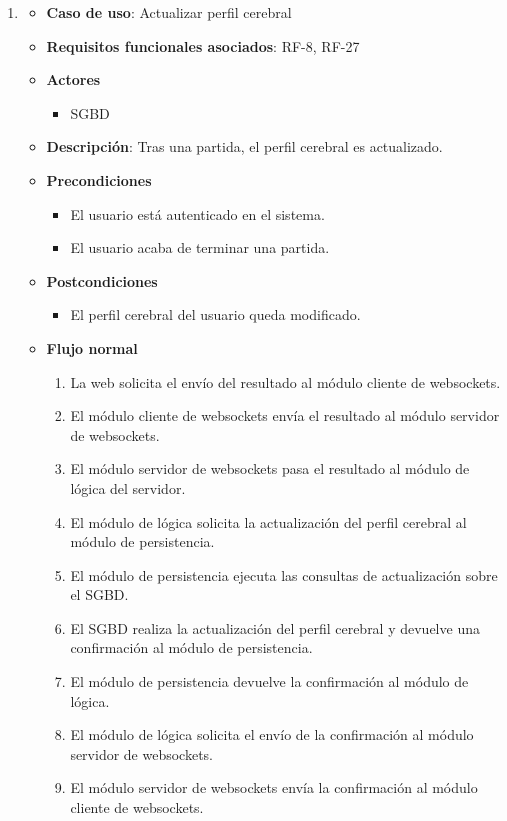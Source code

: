 \begin{enumerate}
\item %
  \begin{itemize}
  \item \textbf{Caso de uso}: Actualizar perfil cerebral
  \item \textbf{Requisitos funcionales asociados}: RF-8, RF-27
  \item \textbf{Actores}
    \begin{itemize}
    \item SGBD
    \end{itemize}
  \item \textbf{Descripción}: Tras una partida, el perfil cerebral es actualizado.
  \item \textbf{Precondiciones}
    \begin{itemize}
    \item El usuario está autenticado en el sistema.
    \item El usuario acaba de terminar una partida.
    \end{itemize}
  \item \textbf{Postcondiciones}
    \begin{itemize}
    \item El perfil cerebral del usuario queda modificado.
    \end{itemize}
  \item \textbf{Flujo normal}
    \begin{enumerate}
    \item La web solicita el envío del resultado al módulo cliente de websockets.
    \item El módulo cliente de websockets envía el resultado al módulo servidor de websockets.
    \item El módulo servidor de websockets pasa el resultado al módulo de lógica del servidor.
    \item El módulo de lógica solicita la actualización del perfil cerebral al módulo de persistencia.
    \item El módulo de persistencia ejecuta las consultas de actualización sobre el SGBD.
    \item El SGBD realiza la actualización del perfil cerebral y devuelve una confirmación al módulo de persistencia.
    \item El módulo de persistencia devuelve la confirmación al módulo de lógica.
    \item El módulo de lógica solicita el envío de la confirmación al módulo servidor de websockets.
    \item El módulo servidor de websockets envía la confirmación al módulo cliente de websockets.

\end{enumerate}
\end{itemize}
\end{enumerate}
